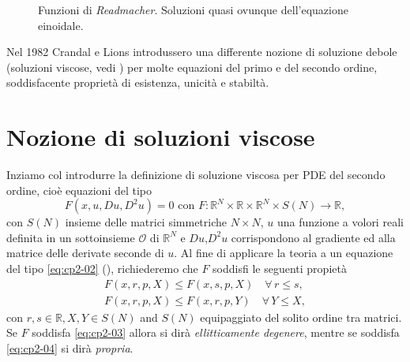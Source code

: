 \begin{figure}[!htb]
  \begin{center}
  \end{center}
  \caption{Funzioni di \emph{Readmacher}. Soluzioni quasi ovunque dell'equazione einoidale.}
  \label{fig:cp2-01}
\end{figure}

Nel 1982 Crandal e Lions introdussero una differente nozione di
soluzione debole (soluzioni viscose, vedi \cite[][]{crand:lion}) per molte equazioni del primo e del secondo ordine, soddisfacente proprietà di esistenza, unicità e stabiltà. 
%
%
%
\section{Nozione di soluzioni viscose}
Inziamo col introdurre la definizione di soluzione viscosa per PDE del secondo ordine, cioè equazioni del tipo
\begin{equation}
\label{eq:cp2-02}
F(x,u,Du,D^2u) = 0\text{ con }F:\mathbb{R}^N\times\mathbb{R}\times\mathbb{R}^N\times S(N)\to \mathbb{R},
\end{equation}
con $S(N)$ insieme delle matrici simmetriche $N\times N$, $u$ una funzione a volori reali definita in un sottoinsieme $\mathcal{O}$ di $\mathbb{R}^N$ e $Du$,$D^2u$ corrispondono al gradiente ed alla matrice delle derivate seconde di $u$. Al fine di applicare la teoria a un equazione del tipo \eqref{eq:cp2-02} (\cite[][]{crand:lion}), richiederemo che $F$ soddisfi le seguenti propietà
\begin{gather}
\label{eq:cp2-03}
F(x,r,p,X) \leq F(x,s,p,X) \quad \forall\,r\leq s,\\
\label{eq:cp2-04}
F(x,r,p,X) \leq F(x,r,p,Y) \quad \forall\,Y\leq X,
\end{gather}
con $r,s\in \mathbb{R},X,Y\in S(N)$ and $S(N)$ equipaggiato del solito ordine tra matrici. Se $F$ soddisfa \eqref{eq:cp2-03} allora si dirà \emph{ellitticamente degenere}, mentre se soddisfa \eqref{eq:cp2-04} si dirà \emph{propria}.

